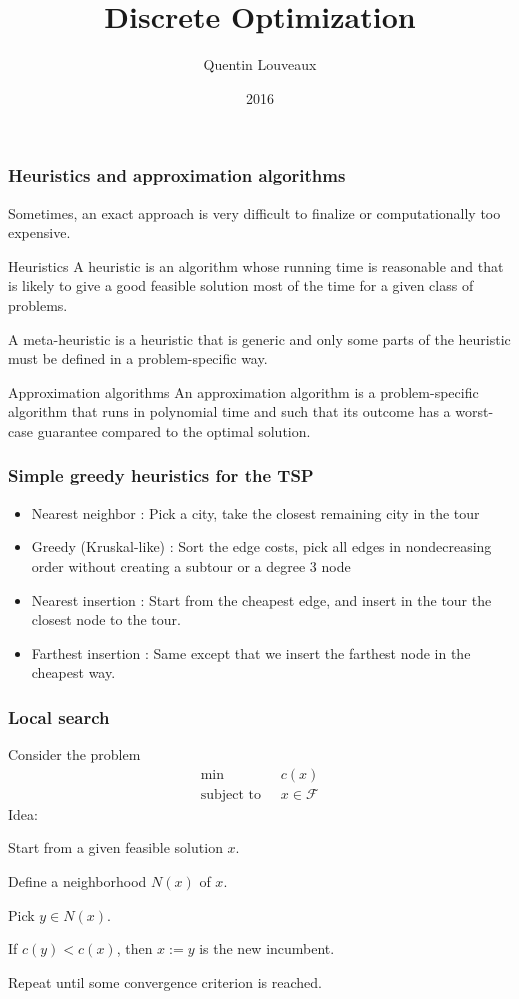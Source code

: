 \documentclass[9pt]{beamer}
\title{Discrete Optimization}
\author{Quentin
Louveaux}
\institute{ULg - Institut Montefiore}
\date{2016}
\begin{document}
\begin{frame}
  \titlepage
\end{frame}
\begin{frame}
\frametitle{Heuristics and approximation algorithms}
Sometimes, an exact approach is \alert{very difficult} to finalize or
\alert{computationally too expensive}.
\begin{block}{Heuristics}
A \alert{heuristic} is an algorithm whose running time is reasonable and that is likely to give 
a \alert{good feasible solution} most of the time for a given class of problems.\bigskip

A \alert{meta-heuristic} is a heuristic that is generic and only some parts of the
heuristic must be defined in a \alert{problem-specific} way.
\end{block}
\begin{block}{Approximation algorithms}
An \alert{approximation algorithm} is a problem-specific algorithm that
runs in \alert{polynomial time} and such that its outcome has a 
worst-case \alert{guarantee} compared to the optimal solution.
\end{block}
\end{frame}
\begin{frame}
\frametitle{Simple greedy heuristics for the TSP}
\begin{itemize}
\item \alert{Nearest neighbor} :  Pick a city, take the \alert{closest remaining city } in the tour\medskip
\item \alert{Greedy} (Kruskal-like) : Sort the edge costs, pick all edges in \alert{nondecreasing order} without creating a subtour or a degree 3 node\medskip
\item \alert{Nearest insertion} :  Start from the cheapest edge, and insert in the tour the \alert{closest node} to the tour.\medskip
\item \alert{Farthest insertion} : Same except that we insert the \alert{farthest} node in the \alert{cheapest} way.
\end{itemize}
\end{frame}
\begin{frame}
\frametitle{Local search}
Consider the problem 
\begin{align*}
\min\; & c(x) \\
\text{subject to }\; & x\in \mathcal F
\end{align*}
\alert{Idea}: \bigskip

Start from a given \alert{feasible solution} $x$.\bigskip

Define a \alert{neighborhood} $N(x)$ of $x$.\bigskip

\alert{Pick} $y\in N(x)$.\bigskip

\alert{If} $c(y)<c(x)$, \alert{then} $x:=y$ is the new incumbent.\bigskip

\alert{Repeat} until some convergence criterion is reached.
\end{frame}
\end{document}
